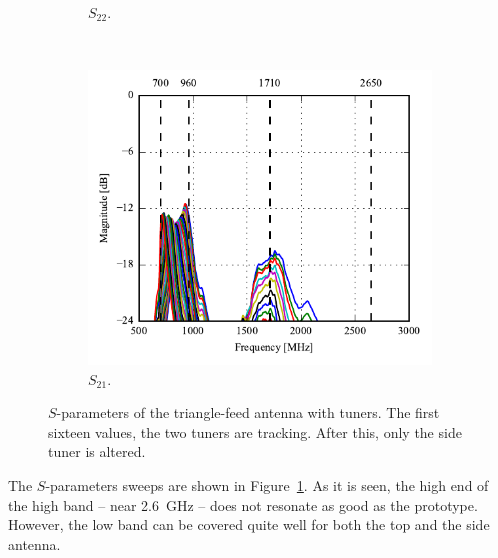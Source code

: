 \begin{figure}[htbp]
\begin{subfigure}{0.49\linewidth}
        \caption{$S_{22}$.}
    \end{subfigure}
    \\
    \begin{subfigure}{0.49\linewidth}
         \includegraphics{img/tech_sol/pcb_trianglefeed/S21}
         \caption{$S_{21}$.}
    \end{subfigure}
    \caption{$S$-parameters of the triangle-feed antenna with tuners. The first sixteen values, the two tuners are tracking. After this, only the side tuner is altered.}
    \label{fig:triang_pcb_sparams}
\end{figure}

The $S$-parameters sweeps are shown in Figure~\ref{fig:triang_pcb_sparams}. As it is seen, the high end of the high band -- near \SI{2.6}{GHz} -- does not resonate as good as the prototype. However, the low band can be covered quite well for both the top and the side antenna.

